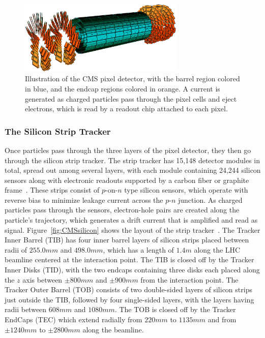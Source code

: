 \begin{figure}[htbp]
  \centering
  \includegraphics[width=0.7\textwidth]{fig/experiment/cms_pixelTracker.pdf}
  \caption{
    Illustration of the CMS pixel detector, with the barrel region colored in blue, and the endcap regions colored in orange.
    A current is generated as charged particles pass through the pixel cells and eject electrons, which is read by a readout chip attached to each pixel.
  }
  \label{fig:CMSpixel}
\end{figure}

\subsubsection{The Silicon Strip Tracker}

Once particles pass through the three layers of the pixel detector, they then go through the silicon strip tracker.
The strip tracker has 15,148 detector modules in total, spread out among several layers, with each module containing 24,244 silicon sensors along with electronic readouts supported by a carbon fiber or graphite frame~\cite{TRK-11-001,Phase1Pixel}.
These strips consist of $p$-on-$n$ type silicon sensors, which operate with reverse bias to minimize leakage current across the $p$-$n$ junction.
As charged particles pass through the sensors, electron-hole pairs are created along the particle's trajectory, which generates a drift current that is amplified and read as signal.
Figure~\ref{fig:CMSsilicon} shows the layout of the strip tracker~\cite{Chatrchyan:1211825}.
The Tracker Inner Barrel (TIB) has four inner barrel layers of silicon strips placed between radii of $255.0\unit{mm}$ and $498.0\unit{mm}$, which has a length of $1.4\unit{m}$ along the LHC beamline centered at the interaction point.
The TIB is closed off by the Tracker Inner Disks (TID), with the two endcaps containing three disks each placed along the $z$ axis between $\pm800\unit{mm}$ and $\pm900\unit{mm}$ from the interaction point.
The Tracker Outer Barrel (TOB) consists of two double-sided layers of silicon strips just outside the TIB, followed by four single-sided layers, with the layers having radii between $608\unit{mm}$ and $1080\unit{mm}$.
The TOB is closed off by the Tracker EndCaps (TEC) which extend radially from $220\unit{mm}$ to $1135\unit{mm}$ and from $\pm1240\unit{mm}$ to $\pm2800\unit{mm}$ along the beamline.


